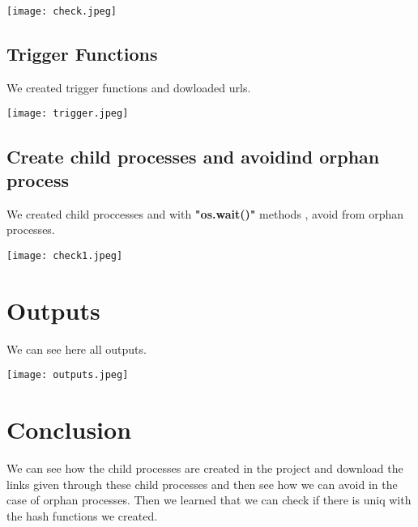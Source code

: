\documentclass[onecolumn]{article}
\begin{document}
\texttt{[image: check.jpeg]}

\subsection{Trigger Functions}

We created trigger functions and dowloaded urls.

\texttt{[image: trigger.jpeg]}

\subsection{Create child processes and avoidind orphan process}

We created child proccesses and with \textbf{"os.wait()"} methods , avoid from orphan processes.

\texttt{[image: check1.jpeg]}

\section{Outputs}
We can see here all outputs.

\texttt{[image: outputs.jpeg]}

\section{Conclusion}
We can see how the child processes are created in the project and download the links given through these child processes and then see how we can avoid in the case of orphan processes. Then we learned that we can check if there is uniq with the hash functions we created. 


\nocite{*}


\end{document}
